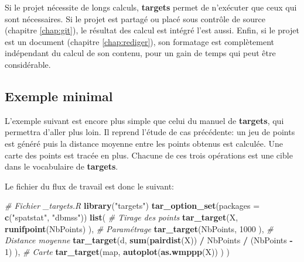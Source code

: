 \documentclass[
  12pt,
  french,
  a4paper,
  extrafontsizes,onecolumn,openright
  ]{memoir}
\newenvironment{Shaded}{\begin{snugshade}}{\end{snugshade}}
\newcommand{\CommentTok}[1]{\textcolor[rgb]{0.56,0.35,0.01}{\textit{#1}}}
\newcommand{\DataTypeTok}[1]{\textcolor[rgb]{0.13,0.29,0.53}{#1}}
\newcommand{\DecValTok}[1]{\textcolor[rgb]{0.00,0.00,0.81}{#1}}
\newcommand{\KeywordTok}[1]{\textcolor[rgb]{0.13,0.29,0.53}{\textbf{#1}}}
\newcommand{\NormalTok}[1]{#1}
\newcommand{\OperatorTok}[1]{\textcolor[rgb]{0.81,0.36,0.00}{\textbf{#1}}}
\newcommand{\StringTok}[1]{\textcolor[rgb]{0.31,0.60,0.02}{#1}}
\begin{document}
Si le projet nécessite de longs calculs, \textbf{targets} permet de n'exécuter que ceux qui sont nécessaires.
Si le projet est partagé ou placé sous contrôle de source (chapitre \ref{chap:git}), le résultat des calcul est intégré l'est aussi.
Enfin, si le projet est un document (chapitre \ref{chap:rediger}), son formatage est complètement indépendant du calcul de son contenu, pour un gain de temps qui peut être considérable.

\hypertarget{exemple-minimal}{%
\subsection{Exemple minimal}\label{exemple-minimal}}

L'exemple suivant est encore plus simple que celui du manuel de \textbf{targets}, qui permettra d'aller plus loin.
Il reprend l'étude de cas précédente: un jeu de points est généré puis la distance moyenne entre les points obtenus est calculée.
Une carte des points est tracée en plus.
Chacune de ces trois opérations est une cible dans le vocabulaire de \textbf{targets}.

Le fichier du flux de travail est donc le suivant:

\scriptsize

\begin{Shaded}
\begin{Highlighting}[]
\CommentTok{# Fichier _targets.R }
\KeywordTok{library}\NormalTok{(}\StringTok{"targets"}\NormalTok{)}
\KeywordTok{tar_option_set}\NormalTok{(}\DataTypeTok{packages =} \KeywordTok{c}\NormalTok{(}\StringTok{"spatstat"}\NormalTok{, }\StringTok{"dbmss"}\NormalTok{))}
\KeywordTok{list}\NormalTok{(}
  \CommentTok{# Tirage des points}
  \KeywordTok{tar_target}\NormalTok{(X,}
    \KeywordTok{runifpoint}\NormalTok{(NbPoints)}
\NormalTok{  ),}
  \CommentTok{# Paramétrage}
  \KeywordTok{tar_target}\NormalTok{(NbPoints,}
    \DecValTok{1000}
\NormalTok{  ),}
  \CommentTok{# Distance moyenne}
  \KeywordTok{tar_target}\NormalTok{(d,}
    \KeywordTok{sum}\NormalTok{(}\KeywordTok{pairdist}\NormalTok{(X)) }\OperatorTok{/}\StringTok{ }\NormalTok{NbPoints }\OperatorTok{/}\StringTok{ }\NormalTok{(NbPoints }\OperatorTok{-}\StringTok{ }\DecValTok{1}\NormalTok{)}
\NormalTok{  ),}
  \CommentTok{# Carte}
  \KeywordTok{tar_target}\NormalTok{(map, }
    \KeywordTok{autoplot}\NormalTok{(}\KeywordTok{as.wmppp}\NormalTok{(X))}
\NormalTok{  )}
\NormalTok{)}
\end{Highlighting}
\end{Shaded}
\end{document}
